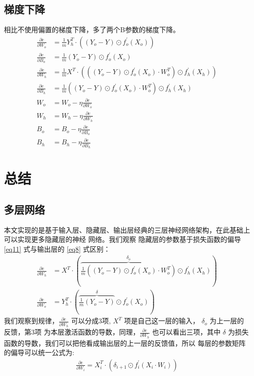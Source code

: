 \documentclass[12pt, a4paper, oneside]{ctexart}
\begin{document}
\subsection{梯度下降}
相比不使用偏置的梯度下降，多了两个B参数的梯度下降。
\begin{align}    
    \frac{\partial e}{\partial W_o} &= \frac{1}{m}Y_h^T \cdot ((Y_o - Y) \odot f_o^{'}(X_o))    \nonumber \\
    \frac{\partial e}{\partial B_o} &= \frac{1}{m}(Y_o - Y) \odot f_o^{'}(X_o) \nonumber \\
    \frac{\partial e}{\partial W_h} &= \frac{1}{m}X^T \cdot (((Y_o - Y) \odot f_o^{'}(X_o) \cdot W_o^T) \odot f_h^{'}(X_h))  \nonumber \\
    \frac{\partial e}{\partial B_h} &= \frac{1}{m}((Y_o - Y) \odot f_o^{'}(X_o) \cdot W_o^T) \odot f_h^{'}(X_h) \nonumber \\
    W_o &= W_o - \eta\frac{\partial e}{\partial W_o} \nonumber \\
    W_h &= W_h - \eta\frac{\partial e}{\partial W_h} \nonumber \\
    B_o &= B_o - \eta\frac{\partial e}{\partial B_o} \nonumber \\
    B_h &= B_h - \eta\frac{\partial e}{\partial B_h} \nonumber 
\end{align}


\newpage
\section{总结}

\subsection{多层网络}
本文实现的是基于输入层、隐藏层、输出层经典的三层神经网络架构，在此基础上可以实现更多隐藏层的神经
网络。我们观察 隐藏层的参数基于损失函数的偏导 \eqref{eq11} 式与输出层的 \eqref{eq8} 式区别：
\begin{align}
    \frac{\partial e}{\partial W_h} &= X^T \cdot (\overbrace{\frac{1}{m}((Y_o - Y) \odot f_o^{'}(X_o) \cdot W_o^T)}^{\delta_o} \odot f_h^{'}(X_h)) \nonumber\\
    \frac{\partial e}{\partial W_o} &= Y_h^T \cdot (\overbrace{\frac{1}{m}(Y_o - Y)}^{\delta} \odot f_o^{'}(X_o)) \nonumber
\end{align}
我们观察到规律，$ \frac{\partial e}{\partial W_h}$ 可以分成3项, $X^T$ 项是自己这一层的输入，
$\delta_o$ 为上一层的反馈，第3项 为本层激活函数的导数，同理，$ \frac{\partial e}{\partial W_h}$ 
也可以看出三项，其中 $\delta$ 为损失函数的导数，我们可以把他看成输出层的上一层的反馈值，所以
每层的参数矩阵的偏导可以统一公式为:
\begin{align}
    \frac{\partial e}{\partial W_{i}} = X_i^T \cdot (\delta_{i+1} \odot f_i^{'}(X_i \cdot W_i))  \nonumber
\end{align}
\end{document}
